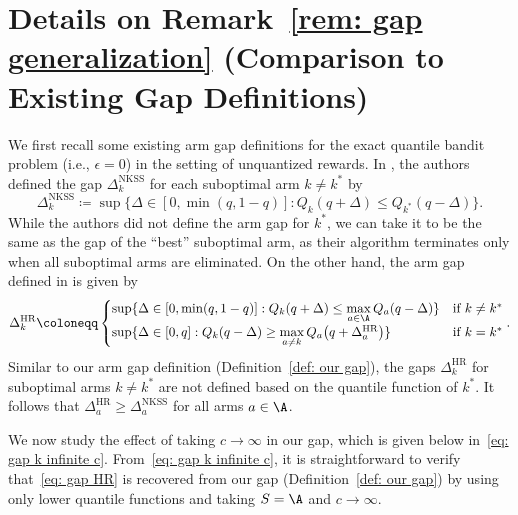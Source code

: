 \section{Details on Remark~\ref{rem: gap generalization} (Comparison to Existing Gap Definitions)}
\label{sec: appendix gap definition generalization}


We first recall some existing arm gap definitions for the exact quantile bandit problem (i.e., $\epsilon = 0$) in the setting of unquantized rewards.
In \cite[Definition 2]{nikolakakis2021quantile}, the authors defined the gap $\Delta_k^{\mathrm{NKSS}} $ for each suboptimal arm $k \ne k^*$ by
\begin{equation}
\label{eq: gap NKSS}
    \Delta_k^{\mathrm{NKSS}} \coloneqq
     \sup
    \{
         \Delta \in \left[0, \min(q, 1-q) \right]
        : 
        Q_k(q + \Delta)
        \le
        Q_{k^*}(q - \Delta)
    \}.
\end{equation}
While the authors did not define the arm gap for $k^*$, we can take it to be the same as the gap of the ``best'' suboptimal arm, as their algorithm terminates only when all suboptimal arms are eliminated.
On the other hand, the arm gap defined in
\cite[(Eq. (27)]{howard2022sequential}
is given by
\begin{equation}
\label{eq: gap HR}
    \Delta_k^{\mathrm{HR}} \coloneqq
    \begin{cases}
     \sup
    \{
         \Delta \in \left[0, \min(q, 1-q) \right]
        : 
        Q_k(q + \Delta)
        \le
        \max\limits_{a \in \A}
        Q_a(q - \Delta)
    \}
    & \text{if } k \ne k^*
    \\
     \sup
    \{
        \Delta 
        \in \left[0, q \right] :
        Q_k(q - \Delta)
        \ge
        \max\limits_{a \neq k}
        Q_{a}\big(q + \Delta_a^{\mathrm{HR}}
        \big)
    \}
    & \text{if } k = k^* 
    \end{cases}.
\end{equation}
Similar to our arm gap definition (Definition~\ref{def: our gap}), the gaps $\Delta_k^{\mathrm{HR}}$ for suboptimal arms $k \ne k^*$ are not defined based on the quantile function of $k^*$. It follows that $\Delta_a^{\mathrm{HR}} \ge \Delta_a^{\mathrm{NKSS}}$ for all arms $a \in \A$.

We now study the effect of taking $c \to \infty$ in our gap, which is given below in~\eqref{eq: gap k infinite c}. From~\eqref{eq: gap k infinite c}, it is straightforward to verify that~\eqref{eq: gap HR} is recovered from our gap (Definition~\ref{def: our gap}) by using only lower quantile functions and taking $S = \A$ and $c \to \infty$. 

